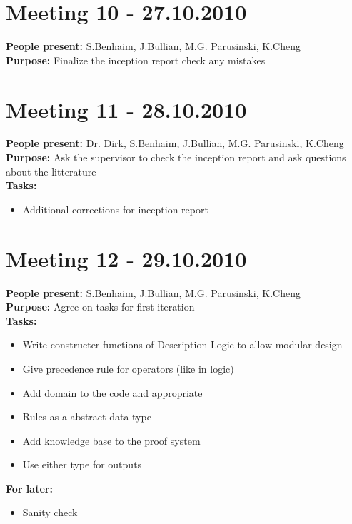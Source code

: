 \documentclass[12pt,a4paper]{article}
\begin{document}
\section*{Meeting 10 - 27.10.2010}

\textbf{People present:} S.Benhaim, J.Bullian, M.G. Parusinski, K.Cheng \\
\textbf{Purpose:} Finalize the inception report check any mistakes \\

\section*{Meeting 11 - 28.10.2010}

\textbf{People present:} Dr. Dirk, S.Benhaim, J.Bullian, M.G. Parusinski, K.Cheng \\
\textbf{Purpose:} Ask the supervisor to check the inception report and ask questions about the litterature \\
\textbf{Tasks:} \\ 
\begin{itemize}
\item Additional corrections for inception report
\end{itemize}

\section*{Meeting 12 - 29.10.2010}

\textbf{People present:} S.Benhaim, J.Bullian, M.G. Parusinski, K.Cheng \\
\textbf{Purpose:} Agree on tasks for first iteration \\
\textbf{Tasks:} \\ 
\begin{itemize}
\item Write constructer functions of Description Logic to allow modular design
\item Give precedence rule for operators (like in logic)
\item Add domain to the code and appropriate
\item Rules as a abstract data type
\item Add knowledge base to the proof system
\item Use either type for outputs
\end{itemize}
\textbf{For later:}
\begin{itemize}
\item Sanity check
\end{itemize}
\end{document}

